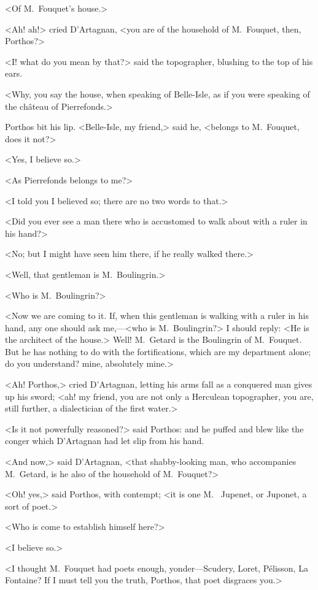 <Of M.~Fouquet's house.>

<Ah! ah!> cried D'Artagnan, <you are of the household of M.~Fouquet, then, Porthos?>

<I\@! what do you mean by that?> said the topographer, blushing to the top of his ears.

<Why, you say the house, when speaking of Belle-Isle, as if you were speaking of the château of Pierrefonds.>

Porthos bit his lip. <Belle-Isle, my friend,> said he, <belongs to M.~Fouquet, does it not?>

<Yes, I believe so.>

<As Pierrefonds belongs to me?>

<I told you I believed so; there are no two words to that.>

<Did you ever see a man there who is accustomed to walk about with a ruler in his hand?>

<No; but I might have seen him there, if he really walked there.>

<Well, that gentleman is M.~Boulingrin.>

<Who is M.~Boulingrin?>

<Now we are coming to it. If, when this gentleman is walking with a ruler in his hand, any one should ask me,—<who is M.~Boulingrin?> I should reply: <He is the architect of the house.> Well! M.~Getard is the Boulingrin of M.~Fouquet. But he has nothing to do with the fortifications, which are my department alone; do you understand? mine, absolutely mine.>

<Ah! Porthos,> cried D'Artagnan, letting his arms fall as a conquered man gives up his sword; <ah! my friend, you are not only a Herculean topographer, you are, still further, a dialectician of the first water.>

<Is it not powerfully reasoned?> said Porthos: and he puffed and blew like the conger which D'Artagnan had let slip from his hand.

<And now,> said D'Artagnan, <that shabby-looking man, who accompanies M.~Getard, is he also of the household of M.~Fouquet?>

<Oh! yes,> said Porthos, with contempt; <it is one M.~ Jupenet, or Juponet, a sort of poet.>

<Who is come to establish himself here?>

<I believe so.>

<I thought M.~Fouquet had poets enough, yonder—Scudery, Loret, Pélisson, La Fontaine? If I must tell you the truth, Porthos, that poet disgraces you.>

